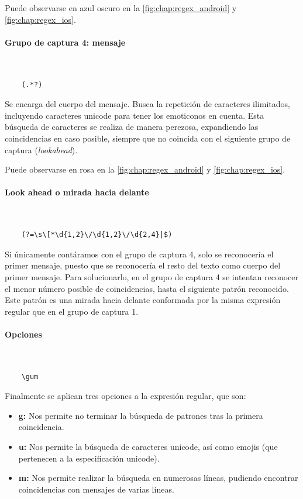 Puede observarse en azul oscuro en la \autoref{fig:chap:regex_android} y \autoref{fig:chap:regex_ios}.

\paragraph{Grupo de captura 4: mensaje}\mbox{}\\

\begin{lstlisting}
	(.*?)
\end{lstlisting}

Se encarga del cuerpo del mensaje. Busca la repetición de caracteres ilimitados, incluyendo caracteres unicode para tener los emoticonos en cuenta. Esta búsqueda de caracteres se realiza de manera perezosa, expandiendo las coincidencias en caso posible, siempre que no coincida con el siguiente grupo de captura (\textit{lookahead}).

Puede observarse en rosa en la \autoref{fig:chap:regex_android} y \autoref{fig:chap:regex_ios}.

\paragraph{Look ahead o mirada hacia delante}\mbox{}\\

\begin{lstlisting}
	(?=\s\[*\d{1,2}\/\d{1,2}\/\d{2,4}|$)
\end{lstlisting}

Si únicamente contáramos con el grupo de captura 4, solo se reconocería el primer mensaje, puesto que se reconocería el resto del texto como cuerpo del primer mensaje. Para solucionarlo, en el grupo de captura 4 se intentan reconocer el menor número posible de coincidencias, hasta el siguiente patrón reconocido. Este patrón es una mirada hacia delante conformada por la misma expresión regular que en el grupo de captura 1.

\paragraph{Opciones}\mbox{}\\

\begin{lstlisting}
	\gum
\end{lstlisting}
 
Finalmente se aplican tres opciones a la expresión regular, que son:

\begin{itemize}
	\item \textbf{g:} Nos permite no terminar la búsqueda de patrones tras la primera coincidencia.
	\item \textbf{u:} Nos permite la búsqueda de caracteres unicode, así como emojis (que pertenecen a la especificación unicode).
	\item \textbf{m:} Nos permite realizar la búsqueda en numerosas líneas, pudiendo encontrar coincidencias con mensajes de varias líneas.
\end{itemize}